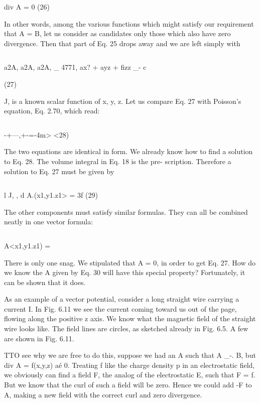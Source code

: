 div A = 0 (26)

In other words, among the various functions which might satisfy our
requirement that \curl A = B, let us consider as candidates only those
which also have zero divergence. Then that part of Eq. 25 drops
away and we are left simply with

\begin{equation}
\end{equation}

a2A, a2A, a2A, _ 4771,
ax? + ayz + fizz _- c

(27)

J, is a known scalar function of x, y, z. Let us compare Eq. 27 with
Poisson's equation, Eq. 2.70, which read:

\begin{equation}
\end{equation}

-+---,+-=-4m> <28)

The two equations are identical in form. We already know how to
find a solution to Eq. 28. The volume integral in Eq. 18 is the pre-
scription. Therefore a solution to Eq. 27 must be given by

\begin{equation}
\end{equation}

l J, , d
A.(x1,y1.z1> = 3f (29)

The other components must satisfy similar formulas. They can all
be combined neatly in one vector formula:

\begin{equation}
\end{equation}

A<x1,y1.z1) = %

There is only one snag. We stipulated that \div A = 0, in order to
get Eq. 27. How do we know the A given by Eq. 30 will have this
special property? Fortunately, it can be shown that it does.

As an example of a vector potential, consider a long straight wire
carrying a current I. In Fig. 6.11 we see the current coming toward
us out of the page, flowing along the positive z axis. We know what
the magnetic field of the straight wire looks like. The field lines are
circles, as sketched already in Fig. 6.5. A few are shown in Fig. 6.11.

TTO see why we are free to do this, suppose we had an A such that \curl A _-. B, but
div A = f(x,y,z) aé 0. Treating f like the charge density p in an electrostatic field, we
obviously can find a field F, the analog of the electrostatic E, such that \div F = f.
But we know that the curl of such a field will be zero. Hence we could add -F to A,
making a new field with the correct curl and zero divergence.

